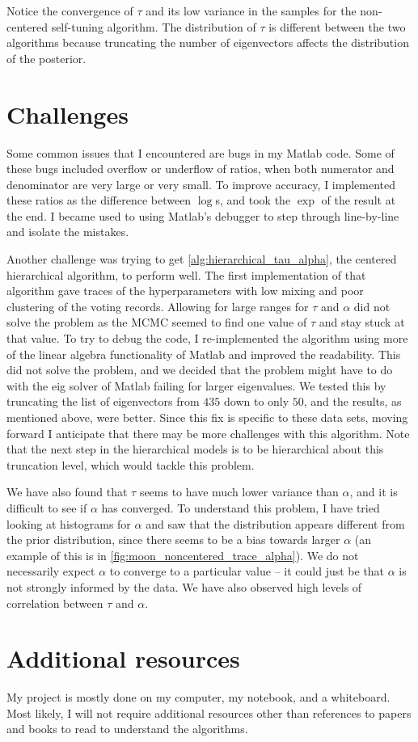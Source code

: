 \documentclass{siamart1116}
\begin{document}
Notice the convergence of $\tau$ and its low variance in the samples for the non-centered self-tuning algorithm. The distribution of $\tau$ is different between the two algorithms because truncating the number of eigenvectors affects the distribution of the posterior.

\section{Challenges}
Some common issues that I encountered are bugs in my Matlab code. Some of these bugs included overflow or underflow of ratios, when both numerator and denominator are very large or very small. To improve accuracy, I implemented these ratios as the difference between $\log$s, and took the $\exp$ of the result at the end. I became used to using Matlab's debugger to step through line-by-line and isolate the mistakes.

Another challenge was trying to get \cref{alg:hierarchical_tau_alpha}, the centered hierarchical algorithm, to perform well. The first implementation of that algorithm gave traces of the hyperparameters with low mixing and poor clustering of the voting records. Allowing for large ranges for $\tau$ and $\alpha$ did not solve the problem as the MCMC seemed to find one value of $\tau$ and stay stuck at that value. To try to debug the code, I re-implemented the algorithm using more of the linear algebra functionality of Matlab and improved the readability. This did not solve the problem, and we decided that the problem might have to do with the eig solver of Matlab failing for larger eigenvalues. We tested this by truncating the list of eigenvectors from $435$ down to only $50$, and the results, as mentioned above, were better. Since this fix is specific to these data sets, moving forward I anticipate that there may be more challenges with this algorithm. Note that the next step in the hierarchical models is to be hierarchical about this truncation level, which would tackle this problem.

We have also found that $\tau$ seems to have much lower variance than $\alpha$, and it is difficult to see if $\alpha$ has converged. To understand this problem, I have tried looking at histograms for $\alpha$ and saw that the distribution appears different from the prior distribution, since there seems to be a bias towards larger $\alpha$ (an example of this is in \cref{fig:moon_noncentered_trace_alpha}). We do not necessarily expect $\alpha$ to converge to a particular value -- it could just be that $\alpha$ is not strongly informed by the data. We have also observed high levels of correlation between $\tau$ and $\alpha$.

\section{Additional resources}
My project is mostly done on my computer, my notebook, and a whiteboard. Most likely, I will not require additional resources other than references to papers and books to read to understand the algorithms.



\end{document}
